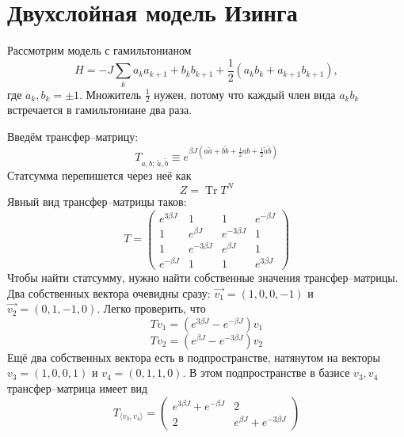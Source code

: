 \documentclass{article}
\begin{document}
	\section{Двухслойная модель Изинга}
		Рассмотрим модель с гамильтонианом
		\begin{equation}
			H = -J\sum_k a_k a_{k+1} + b_k b_{k+1} + \frac{1}{2}(a_k b_k + a_{k+1} b_{k+1}),
		\end{equation}
		где $a_k, b_k = \pm 1$. Множитель $\frac{1}{2}$ нужен, потому что каждый член вида 
		$a_k b_k$ встречается в гамильтониане два раза.
		
		Введём трансфер--матрицу:
		\begin{equation}
			T_{a,b;\,\tilde{a},\tilde{b}} \equiv
				e^{\beta J(a\tilde{a}+ b\tilde{b} + 
						\frac{1}{2}ab + \frac{1}{2}\tilde{a}\tilde{b})}
		\end{equation}
		Статсумма перепишется через неё как
		\begin{equation}
			Z = \mathop{\mathrm{Tr}} T^N
		\end{equation}
		Явный вид трансфер--матрицы таков:
		\begin{equation}
			T = \left( 
				\begin{matrix}
					e^{3\beta J}	& 1 			& 1			& e^{-\beta J}	\\
					1			& e^{\beta J}	& e^{-3\beta J}& 1  		\\	
					1 			& e^{-3\beta J}& e^{\beta J}	& 1			\\
					e^{-\beta J}	& 1 			& 1			& e^{3\beta J}	
				\end{matrix}
				\right)
		\end{equation}
		Чтобы найти статсумму, нужно найти собственные значения трансфер--матрицы.
		Два собственных вектора очевидны сразу: $\vec{v_1} = (1,0,0,-1)$ и 
		$\vec{v_2} = (0,1,-1,0)$.
		Легко проверить, что
		\begin{equation}
			T v_1 = (e^{3\beta J} -  e^{-\beta J}) v_1
		\end{equation}
		\begin{equation}
			T v_2 = (e^{\beta J} -  e^{-3\beta J}) v_2
		\end{equation}
		Ещё два собственных вектора есть в подпространстве, натянутом на векторы
		$v_3 = (1,0,0,1)$ и $v_4 = (0,1,1,0)$. В этом подпространстве в базисе $v_3, v_4$
		трансфер--матрица имеет вид 
		\begin{equation}
			T_{\langle v_3, v_4 \rangle} =
			\left(
				\begin{matrix}
					e^{3\beta J} + e^{-\beta J}	& 2 \\
					2						& e^{\beta J} + e^{-3\beta J}
				\end{matrix}
			\right)
		\end{equation}
\end{document}
